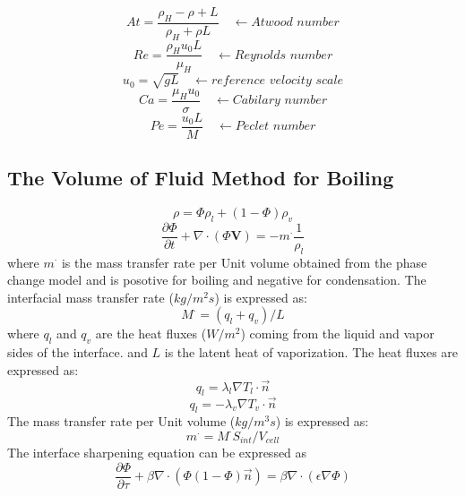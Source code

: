 \documentclass[12pt]{extarticle}
\begin{document}
\begin{equation}
At = \frac{\rho_{H} - \rho+{L}}{\rho_{H}+\rho{L}}  \quad \leftarrow \textit{Atwood number}
\end{equation}
\begin{equation}
Re = \frac{\rho_{H} u_{0} L}{\mu_{H}} \quad \leftarrow \textit{Reynolds number}
\end{equation}
\begin{equation}
u_{0} = \sqrt{gL}  \quad \leftarrow \textit{reference velocity scale}
\end{equation}
\begin{equation}
Ca = \frac{\mu_{H} u_{0}}{\sigma}  \quad \leftarrow \textit{Cabilary number}
\end{equation}
\begin{equation}
Pe = \frac{u_{0} L }{M}  \quad \leftarrow \textit{Peclet number}
\end{equation}

\subsection*{The Volume of Fluid Method for Boiling}
\begin{equation}
\rho = \Phi \rho_{l} + (1-\Phi) \rho_{v}
\end{equation}
\begin{equation}
\frac{\partial\Phi}{\partial t} + \nabla \cdot (\Phi \textbf{V}) = - m^{\cdot} \frac{1}{\rho_{l}} 
\label{sharpphasefield}
\end{equation}
where $m^{\cdot}$ is the mass transfer rate per Unit volume obtained from the phase change model and is posotive for boiling and negative for condensation.
The interfacial mass transfer rate ($kg/m^{2} s$) is expressed as:
\begin{equation}
M^{\cdot} = (q_{l} + q_{v})/L
\end{equation}
where $q_{l}$ and $q_{v}$ are the heat fluxes ($W/m^{2}$) coming from the liquid and vapor sides of the interface. and $L$ is the latent heat of vaporization. The heat fluxes are expressed as:
\begin{equation}
q_{l} = \lambda_{l} \nabla T_{l} \cdot \vec{n}
\end{equation}
\begin{equation}
q_{l} = -\lambda_{v} \nabla T_{v} \cdot \vec{n}
\end{equation}
The mass transfer rate per Unit volume ($kg/m^{3} s$) is expressed as:
\begin{equation}
m^{\cdot} = M^{\cdot} S_{int} / V_{cell}
\end{equation}
The interface sharpening equation can be expressed as
\begin{equation}
\frac{\partial\Phi}{\partial \tau} + \beta \nabla \cdot (\Phi (1-\Phi) \vec{n} ) = \beta \nabla \cdot (\epsilon \nabla \Phi)
\end{equation}
\end{document}
